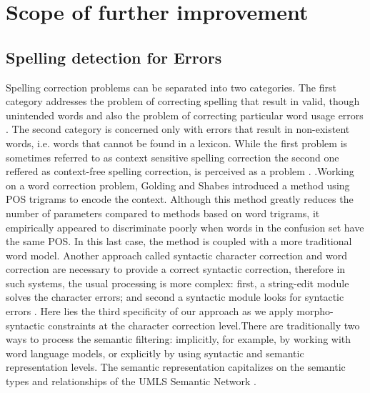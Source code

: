\section{Scope of further improvement}
\subsection{ Spelling detection for Errors}
Spelling correction problem\cite{Ruch2003SpellingCorrectionEPR}s can be separated into two categories. The first category
addresses the problem of correcting spelling that result in valid, though unintended words
 and also the problem of
correcting particular word usage errors . The second category
is concerned only with errors that result in non-existent words, i.e. words that cannot be
found in a lexicon. While the first problem is sometimes referred to as context sensitive
spelling correction the second one reffered as 
 context-free spelling correction, is perceived as a problem .
.Working on a word correction problem, Golding and Shabes  introduced a method
using POS trigrams
to encode the context. Although this method greatly reduces the
number of parameters compared to methods based on word trigrams,
it empirically
appeared to discriminate poorly when words in the confusion set have the same POS. In
 this last case, the method is coupled with a more traditional word model. Another approach called syntactic character correction and word correction are necessary to provide a correct
syntactic correction, therefore in such systems, the usual processing is more complex: first,
a string-edit module solves the character errors; and second a syntactic module looks for syntactic errors . Here lies the third specificity of our approach as we apply morpho-
syntactic constraints at the character correction level.There are traditionally two ways to process the semantic filtering: implicitly, for
example, by working with word language models, or explicitly by using syntactic and
semantic representation levels. The semantic representation  capitalizes
on the  semantic types and  relationships of the UMLS Semantic Network . 
